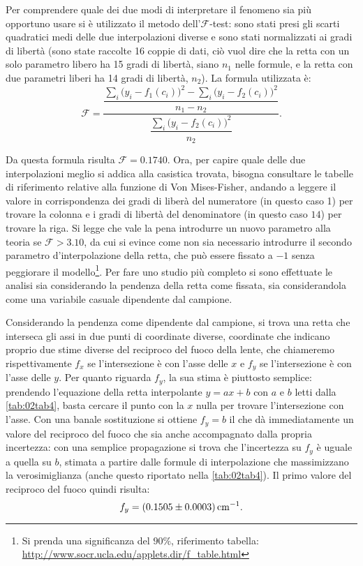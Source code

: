 Per comprendere quale dei due modi di interpretare il fenomeno sia più opportuno usare si \`e utilizzato il metodo dell'$\mathcal{F}$-test:
 sono stati presi gli scarti quadratici medi delle due interpolazioni diverse e sono stati normalizzati ai gradi di libertà
 (sono state raccolte 16 coppie di dati, ciò vuol dire che la retta con un solo parametro libero ha 15 gradi di libertà,
 siano $n_1$ nelle formule, e la retta con due parametri liberi ha 14 gradi di libertà, $n_2$).
 La formula utilizzata è:
\[\mathcal{F}=\frac{\dfrac{{\sum_i \big( y_i-f_1 (c_i) \big) ^2} - {\sum_i \big( y_i-f_2 (c_i) \big) ^2}}{n_1-n_2}}{\dfrac{\sum_i \big( y_i-f_2 
(c_i) \big) ^2}{n_2}}.\]

Da questa formula risulta $\mathcal{F} = 0.1740$. Ora, per capire quale delle due interpolazioni meglio si addica alla
 casistica trovata, bisogna consultare le tabelle di riferimento relative alla funzione di Von Mises-Fisher, andando a leggere il valore
 in corrispondenza dei gradi di liberà del numeratore (in questo caso 1) per trovare la colonna e i gradi di libertà del denominatore
 (in questo caso $14$) per trovare la riga. Si legge che vale la pena introdurre un nuovo parametro alla teoria 
 se $\mathcal{F} > 3.10$, 
 da cui si evince come non sia necessario introdurre il secondo parametro d'interpolazione della retta, che 
 può essere fissato a $-1$ senza peggiorare il modello\footnote{Si prenda una significanza del $90\%$, 
 riferimento tabella: \url{http://www.socr.ucla.edu/applets.dir/f_table.html}}. 
 Per fare uno studio pi\`u completo si sono effettuate le analisi sia considerando la pendenza della retta come fissata,
 sia considerandola come una variabile casuale dipendente dal campione.

Considerando la pendenza come dipendente dal campione, si trova una retta che interseca gli assi in due punti di coordinate diverse,
 coordinate che indicano proprio due stime diverse del reciproco del fuoco della lente, che chiameremo rispettivamente
$f_x$ se l'intersezione è con l'asse delle $x$ e $f_y$ se l'intersezione è con l'asse delle $y$.
 Per quanto riguarda $f_y$, la sua stima è piuttosto semplice: prendendo l'equazione della retta interpolante $y=ax + b$
 con $a$ e $b$ letti dalla \autoref{tab:02tab4}, basta cercare il punto con la $x$ nulla per trovare l'intersezione con l'asse.
 Con una banale sostituzione si ottiene $f_y= b$ il che dà immediatamente un valore del reciproco del fuoco che sia anche
 accompagnato dalla propria incertezza: con una semplice propagazione si trova che l'incertezza su $f_y$ è uguale a quella su $b$,
 stimata a partire dalle formule di interpolazione che massimizzano la verosimiglianza (anche questo riportato nella 
\autoref{tab:02tab4}).
 Il primo valore del reciproco del fuoco quindi risulta:
\[f_y = (0.1505 \pm 0.0003) \,\mathrm{cm}^{-1}.\]


